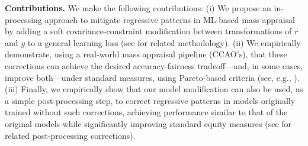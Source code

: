 \documentclass[11pt]{article}
\theoremstyle{plain}
\theoremstyle{definition}
\newcommand{\R}{\mathbb{R}}
\newcommand{\1}{\mathbf{1}}
\renewcommand{\L}{\mathcal{L}}
\renewcommand{\H}{\mathcal{H}}
\renewcommand{\R}{\mathbb{R}}
\begin{document}

\textbf{Contributions.} We make the following contributions: (i) We propose an in-processing approach to mitigate regressive patterns in ML-based mass appraisal by adding a soft covariance-constraint modification between transformations of $r$ and $y$ to a general learning loss (see \textcite{lee2022maximal} for related methodology). (ii) We empirically demonstrate, using a real-world mass appraisal pipeline (CCAO's), that these corrections can achieve the desired accuracy-fairness tradeoff—and, in some cases, improve both—under standard measures, using Pareto-based criteria (see, e.g., \textcite{martinez2020minimax, little2022fairness}). (iii) Finally, we empirically show that our model modification can also be used, as a simple post-processing step, to correct regressive patterns in models originally trained without such corrections, achieving performance similar to that of the original models while significantly improving standard equity measures (see \textcite{lee2022maximal, little2022fairness} for related post-processing corrections).  


\end{document}
